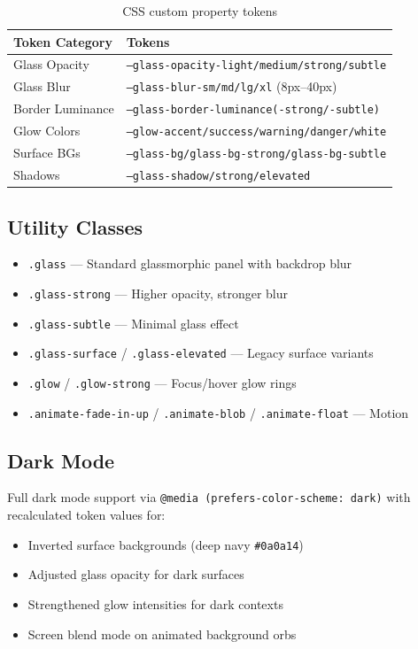 \documentclass[12pt,a4paper]{article}
\begin{document}
\begin{table}[H]
\centering
\begin{tabularx}{\textwidth}{lX}
\toprule
\textbf{Token Category} & \textbf{Tokens} \\
\midrule
Glass Opacity    & \texttt{--glass-opacity-light/medium/strong/subtle} \\
Glass Blur       & \texttt{--glass-blur-sm/md/lg/xl} (8px--40px) \\
Border Luminance & \texttt{--glass-border-luminance(-strong/-subtle)} \\
Glow Colors      & \texttt{--glow-accent/success/warning/danger/white} \\
Surface BGs      & \texttt{--glass-bg/glass-bg-strong/glass-bg-subtle} \\
Shadows          & \texttt{--glass-shadow/strong/elevated} \\
\bottomrule
\end{tabularx}
\caption{CSS custom property tokens}
\end{table}

\subsection{Utility Classes}

\begin{itemize}[leftmargin=2em]
  \item \texttt{.glass} --- Standard glassmorphic panel with backdrop blur
  \item \texttt{.glass-strong} --- Higher opacity, stronger blur
  \item \texttt{.glass-subtle} --- Minimal glass effect
  \item \texttt{.glass-surface} / \texttt{.glass-elevated} --- Legacy surface variants
  \item \texttt{.glow} / \texttt{.glow-strong} --- Focus/hover glow rings
  \item \texttt{.animate-fade-in-up} / \texttt{.animate-blob} / \texttt{.animate-float} --- Motion
\end{itemize}

\subsection{Dark Mode}

Full dark mode support via \texttt{@media (prefers-color-scheme: dark)} with recalculated token values for:
\begin{itemize}[leftmargin=2em]
  \item Inverted surface backgrounds (deep navy \texttt{\#0a0a14})
  \item Adjusted glass opacity for dark surfaces
  \item Strengthened glow intensities for dark contexts
  \item Screen blend mode on animated background orbs
\end{itemize}
\end{document}
